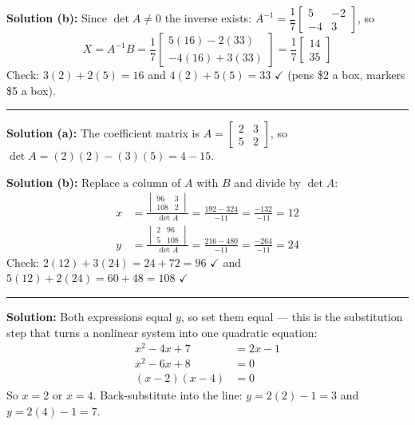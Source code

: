\documentclass[12pt]{article}
\begin{document}
\textbf{Solution (b):} Since $\det A \neq 0$ the inverse exists:
$A^{-1} = \dfrac{1}{7}\begin{bmatrix} 5 & -2 \\ -4 & 3 \end{bmatrix}$, so
\[
X = A^{-1}B = \frac{1}{7}\begin{bmatrix} 5(16) - 2(33) \\ -4(16) + 3(33) \end{bmatrix}
 = \frac{1}{7}\begin{bmatrix} 14 \\ 35 \end{bmatrix}
\]
Check: $3(2) + 2(5) = 16$ and $4(2) + 5(5) = 33$ $\checkmark$ (pens \$2 a box, markers \$5 a box).

\vspace{0.2cm}\noindent\rule{\linewidth}{0.2pt}


\textbf{Solution (a):} The coefficient matrix is
$A = \begin{bmatrix} 2 & 3 \\ 5 & 2 \end{bmatrix}$, so
$\det A = (2)(2) - (3)(5) = 4 - 15$.

\textbf{Solution (b):} Replace a column of $A$ with $B$ and divide by $\det A$:
\begin{align*}
 x &= \frac{\begin{vmatrix} 96 & 3 \\ 108 & 2\end{vmatrix}}{\det A}
    = \frac{192 - 324}{-11} = \frac{-132}{-11} = 12 \\[4pt]
 y &= \frac{\begin{vmatrix} 2 & 96 \\ 5 & 108\end{vmatrix}}{\det A}
    = \frac{216 - 480}{-11} = \frac{-264}{-11} = 24
\end{align*}
Check: $2(12) + 3(24) = 24 + 72 = 96$ $\checkmark$ and $5(12) + 2(24) = 60 + 48 = 108$ $\checkmark$

\vspace{0.2cm}\noindent\rule{\linewidth}{0.2pt}


\textbf{Solution:} Both expressions equal $y$, so set them equal --- this is the
substitution step that turns a nonlinear system into one quadratic equation:
\begin{align*}
  x^2 - 4x + 7 &= 2x - 1 \\
  x^2 - 6x + 8 &= 0 \\
  (x - 2)(x - 4) &= 0
\end{align*}
So $x = 2$ or $x = 4$. Back-substitute into the line: $y = 2(2) - 1 = 3$ and
$y = 2(4) - 1 = 7$.
\end{document}

